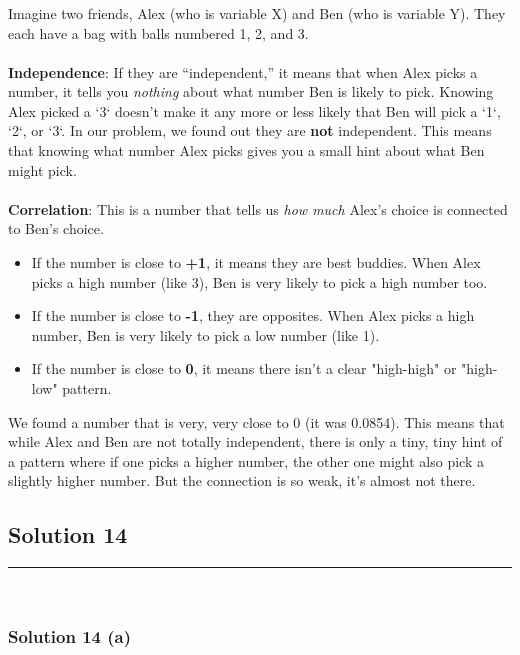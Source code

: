 \documentclass{article}
\begin{document}
\subsubsection*{}
Imagine two friends, Alex (who is variable X) and Ben (who is variable Y). They each have a bag with balls numbered 1, 2, and 3.
\\ \\
\textbf{Independence}: If they are ``independent,'' it means that when Alex picks a number, it tells you \textit{nothing} about what number Ben is likely to pick. Knowing Alex picked a `3` doesn't make it any more or less likely that Ben will pick a `1`, `2`, or `3`. In our problem, we found out they are \textbf{not} independent. This means that knowing what number Alex picks gives you a small hint about what Ben might pick.
\\ \\
\textbf{Correlation}: This is a number that tells us \textit{how much} Alex's choice is connected to Ben's choice.
\begin{itemize}
    \item If the number is close to \textbf{+1}, it means they are best buddies. When Alex picks a high number (like 3), Ben is very likely to pick a high number too.
    \item If the number is close to \textbf{-1}, they are opposites. When Alex picks a high number, Ben is very likely to pick a low number (like 1).
    \item If the number is close to \textbf{0}, it means there isn't a clear "high-high" or "high-low" pattern.
\end{itemize}
We found a number that is very, very close to 0 (it was 0.0854). This means that while Alex and Ben are not totally independent, there is only a tiny, tiny hint of a pattern where if one picks a higher number, the other one might also pick a slightly higher number. But the connection is so weak, it's almost not there.


\newpage

\subsection*{Solution 14}
\noindent\rule{\textwidth}{0.4pt}\\
\subsubsection*{Solution  14 (a)}
\end{document}
